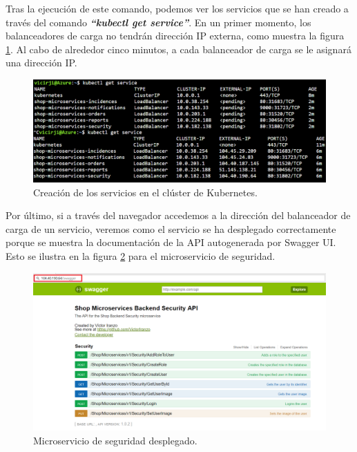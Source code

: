 \documentclass[11pt,spanish,listoffigures]{tfgetsinf}
\begin{document}
Tras la ejecución de este comando, podemos ver los servicios que se han creado a través del comando \textit{\textbf{``kubectl get service''}}. En un primer momento, los balanceadores de carga no tendrán dirección IP externa, como muestra la figura \ref{fig:ServiciosKubernetes}. Al cabo de alrededor cinco minutos, a cada balanceador de carga se le asignará una dirección IP.

\begin{figure}[h]
\centering
\includegraphics[scale=0.55]{ServiciosKubernetes}
\caption{Creación de los servicios en el clúster de Kubernetes.}
\label{fig:ServiciosKubernetes}
\end{figure}

Por último, si a través del navegador accedemos a la dirección del balanceador de carga de un servicio, veremos como el servicio se ha desplegado correctamente porque se muestra la documentación de la API autogenerada por Swagger UI. Esto se ilustra en la figura \ref{fig:MicroservicioDesplegado} para el microservicio de seguridad.

\begin{figure}[h]
\centering
\includegraphics[scale=0.5]{MicroservicioDesplegado} 
\caption{Microservicio de seguridad desplegado.}
\label{fig:MicroservicioDesplegado}
\end{figure}

\newpage
\end{document}
